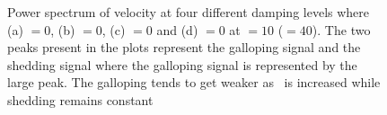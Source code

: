 \begin{figure}
  \setlength{\unitlength}{\textwidth}
  \caption{Power spectrum of velocity at four different damping levels where (a) \massdamp$=0$, (b) \massdamp$=0$, (c) \massdamp$=0$ and (d) \massdamp$=0$ at \massstiff $=10$ (\ustar$=40$). The two peaks present in the plots represent the galloping signal and the shedding signal where the galloping signal is represented by the large peak. The galloping tends to get weaker as \massdamp \ is increased while shedding remains constant}
    \label{fig:power_data}
\end{figure}

